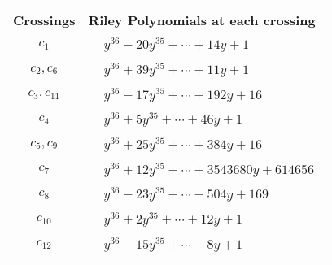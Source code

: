 \documentclass[1p]{elsarticle_modified}
\theoremstyle{definition}
\begin{document}
\begin{tabular}{m{50pt}|m{274pt}}
Crossings & \hspace{64pt}Riley Polynomials at each crossing \\
\hline $$\begin{aligned}c_{1}\end{aligned}$$&$\begin{aligned}
&y^{36}-20 y^{35}+\cdots+14 y+1
\end{aligned}$\\
\hline $$\begin{aligned}c_{2},c_{6}\end{aligned}$$&$\begin{aligned}
&y^{36}+39 y^{35}+\cdots+11 y+1
\end{aligned}$\\
\hline $$\begin{aligned}c_{3},c_{11}\end{aligned}$$&$\begin{aligned}
&y^{36}-17 y^{35}+\cdots+192 y+16
\end{aligned}$\\
\hline $$\begin{aligned}c_{4}\end{aligned}$$&$\begin{aligned}
&y^{36}+5 y^{35}+\cdots+46 y+1
\end{aligned}$\\
\hline $$\begin{aligned}c_{5},c_{9}\end{aligned}$$&$\begin{aligned}
&y^{36}+25 y^{35}+\cdots+384 y+16
\end{aligned}$\\
\hline $$\begin{aligned}c_{7}\end{aligned}$$&$\begin{aligned}
&y^{36}+12 y^{35}+\cdots+3543680 y+614656
\end{aligned}$\\
\hline $$\begin{aligned}c_{8}\end{aligned}$$&$\begin{aligned}
&y^{36}-23 y^{35}+\cdots-504 y+169
\end{aligned}$\\
\hline $$\begin{aligned}c_{10}\end{aligned}$$&$\begin{aligned}
&y^{36}+2 y^{35}+\cdots+12 y+1
\end{aligned}$\\
\hline $$\begin{aligned}c_{12}\end{aligned}$$&$\begin{aligned}
&y^{36}-15 y^{35}+\cdots-8 y+1
\end{aligned}$\\
\hline
\end{tabular}\\~\\
\end{document}
